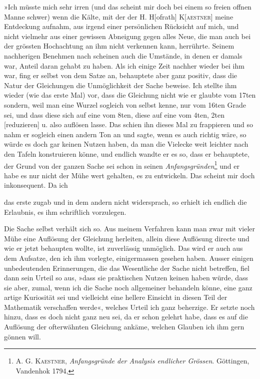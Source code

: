 »Ich müsste mich sehr irren (und das scheint mir doch bei einem so
freien offnen Manne schwer) wenn die Kälte, mit der der H. H[ofrath] K[\textsc{aestner}]
meine Entdeckung aufnahm, aus irgend einer persönlichen Rücksicht auf mich,
und nicht vielmehr aus einer gewissen Abneigung gegen alles Neue, die man
auch bei der grössten Hochachtung an ihm nicht verkennen kann, herrührte.
Seinem nachherigen Benehmen nach scheinen auch die Umstände, in denen
er damals war, Anteil daran gehabt zu haben. Als ich einige Zeit nachher
wieder bei ihm war, fing er selbst von dem Satze an, behauptete aber ganz
positiv, dass die Natur der Gleichungen die Unmöglichkeit der Sache beweise.
Ich stellte ihm wieder (wie das erste Mal) vor, dass die Gleichung nicht wie
er glaubte vom 17ten sondern, weil man eine Wurzel sogleich von selbst kenne,
nur vom 16ten Grade sei, und dass diese sich auf eine vom 8ten, diese auf
eine vom 4ten, 2ten [reduzieren] u. also auflösen lasse. Das schien ihn dieses
Mal zu frappieren und so nahm er sogleich einen andern Ton an und sagte,
wenn es auch richtig wäre, so würde es doch gar keinen Nutzen haben, da
man die Vielecke weit leichter nach den Tafeln konstruieren könne, und endlich
wandte er es so, dass er behauptete, der Grund von der ganzen Sache
sei schon in seinen \textit{Anfangsgründen}\footnote{A. G. \textsc{Kaestner}, \textit{Anfangsgründe der Analysis endlicher Grössen}. Göttingen, Vandenhok 1794,} und er habe es nur nicht der Mühe
wert gehalten, es zu entwickeln. Das scheint mir doch inkonsequent. Da ich\par
\clearpage{}
\noindent das erste zugab und in dem andern nicht widersprach, so erhielt ich endlich
die Erlaubnis, es ihm schriftlich vorzulegen.

Die Sache selbst verhält sich so. Aus meinem Verfahren kann man zwar mit
vieler Mühe eine Auflösung der Gleichung herleiten, allein diese Auflösung
directe und wie er jetzt behaupten wollte, ist zuverlässig unmöglich. Das
wird er auch aus dem Aufsatze, den ich ihm vorlegte, einigermassen gesehen
haben. Ausser einigen unbedeutenden Erinnerungen, die das Wesentliche
der Sache nicht betreffen, fiel dann sein Urteil so aus, »dass sie praktischen
Nutzen keinen haben würde, dass sie aber, zumal, wenn ich die Sache noch
allgemeiner behandeln könne, eine ganz artige Kuriosität sei und vielleicht
eine hellere Einsicht in diesen Teil der Mathematik verschaffen werde«, welches
Urteil ich ganz beherzige. Er setzte noch hinzu, dass es doch nicht
ganz neu sei, da er schon gelehrt habe, dass es auf die Auflösung der ofterwähnten
Gleichung ankäme, welchen Glauben ich ihm gern gönnen will.

